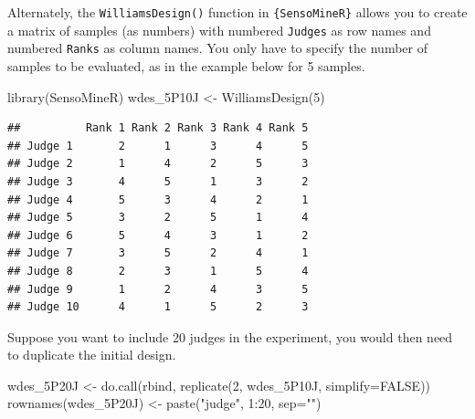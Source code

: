 \documentclass[
]{krantz}
\makeatletter
\newenvironment{Shaded}{\begin{snugshade}}{\end{snugshade}}
\newcommand{\AttributeTok}[1]{\textcolor[rgb]{0.61,0.61,0.61}{#1}}
\newcommand{\ConstantTok}[1]{\textcolor[rgb]{0,0,0}{#1}}
\newcommand{\DecValTok}[1]{\textcolor[rgb]{0.06,0.06,0.06}{#1}}
\newcommand{\FunctionTok}[1]{\textcolor[rgb]{0,0,0}{#1}}
\newcommand{\NormalTok}[1]{#1}
\newcommand{\OtherTok}[1]{\textcolor[rgb]{0.37,0.37,0.37}{#1}}
\newcommand{\SpecialCharTok}[1]{\textcolor[rgb]{0,0,0}{#1}}
\newcommand{\StringTok}[1]{\textcolor[rgb]{0.5,0.5,0.5}{#1}}
\newenvironment{kframe}{%
\medskip{}
\setlength{\fboxsep}{.8em}
 \def\at@end@of@kframe{}%
 \ifinner\ifhmode%
  \def\at@end@of@kframe{\end{minipage}}%
  \begin{minipage}{\columnwidth}%
 \fi\fi%
 \def\FrameCommand##1{\hskip\@totalleftmargin \hskip-\fboxsep
 \colorbox{shadecolor}{##1}\hskip-\fboxsep
     \hskip-\linewidth \hskip-\@totalleftmargin \hskip\columnwidth}%
 \MakeFramed {\advance\hsize-\width
   \@totalleftmargin\z@ \linewidth\hsize
   \@setminipage}}%
 {\par\unskip\endMakeFramed%
 \at@end@of@kframe}
\renewenvironment{Shaded}{\begin{kframe}}{\end{kframe}}
\makeatother
\begin{document}
Alternately, the \texttt{WilliamsDesign()} function in \texttt{\{SensoMineR\}} allows you to create a matrix of samples (as numbers) with numbered \texttt{Judges} as row names and numbered \texttt{Ranks} as column names. You only have to specify the number of samples to be evaluated, as in the example below for 5 samples.

\begin{Shaded}
\begin{Highlighting}[]
\FunctionTok{library}\NormalTok{(SensoMineR)}
\NormalTok{wdes\_5P10J }\OtherTok{\textless{}{-}} \FunctionTok{WilliamsDesign}\NormalTok{(}\DecValTok{5}\NormalTok{)}
\end{Highlighting}
\end{Shaded}

\begin{verbatim}
##          Rank 1 Rank 2 Rank 3 Rank 4 Rank 5
## Judge 1       2      1      3      4      5
## Judge 2       1      4      2      5      3
## Judge 3       4      5      1      3      2
## Judge 4       5      3      4      2      1
## Judge 5       3      2      5      1      4
## Judge 6       5      4      3      1      2
## Judge 7       3      5      2      4      1
## Judge 8       2      3      1      5      4
## Judge 9       1      2      4      3      5
## Judge 10      4      1      5      2      3
\end{verbatim}

Suppose you want to include 20 judges in the experiment, you would then need to duplicate the initial design.

\begin{Shaded}
\begin{Highlighting}[]
\NormalTok{wdes\_5P20J }\OtherTok{\textless{}{-}} \FunctionTok{do.call}\NormalTok{(rbind, }\FunctionTok{replicate}\NormalTok{(}\DecValTok{2}\NormalTok{, wdes\_5P10J, }\AttributeTok{simplify=}\ConstantTok{FALSE}\NormalTok{))}
\FunctionTok{rownames}\NormalTok{(wdes\_5P20J) }\OtherTok{\textless{}{-}} \FunctionTok{paste}\NormalTok{(}\StringTok{"judge"}\NormalTok{, }\DecValTok{1}\SpecialCharTok{:}\DecValTok{20}\NormalTok{, }\AttributeTok{sep=}\StringTok{""}\NormalTok{)}
\end{Highlighting}
\end{Shaded}
\end{document}
